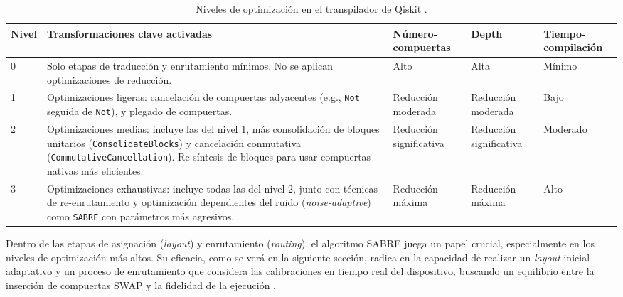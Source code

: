 \documentclass[12pt, spanish]{book}
\begin{document}
\begin{table}[htbp]
    \centering
    \caption{Niveles de optimización en el transpilador de Qiskit \cite{IBM_transpile_2025}.\\}
    \label{tab:opt_levels}
    \begin{tabular}{p{0.7cm} p{6.3cm} p{1.6cm} p{1.6cm} p{1.6cm}}
        \toprule
        \textbf{Nivel} & \textbf{Transformaciones clave activadas}                                                                                                                                                                                                             & \textbf{Número-compuertas} & \textbf{Depth}          & \textbf{Tiempo-compilación} \\
        \midrule
        0              & Solo etapas de traducción y enrutamiento mínimos. No se aplican optimizaciones de reducción.                                                                                                                                                          & Alto                       & Alta                    & Mínimo                      \\
        1              & Optimizaciones ligeras: cancelación de compuertas adyacentes (e.g., \texttt{Not} seguida de \texttt{Not}), y plegado de compuertas.                                                                                                                   & Reducción moderada         & Reducción moderada      & Bajo                        \\
        2              & Optimizaciones medias: incluye las del nivel 1, más consolidación de bloques unitarios (\texttt{ConsolidateBlocks}) y cancelación conmutativa (\texttt{CommutativeCancellation}). Re-síntesis de bloques para usar compuertas nativas más eficientes. & Reducción significativa    & Reducción significativa & Moderado                    \\
        3              & Optimizaciones exhaustivas: incluye todas las del nivel 2, junto con técnicas de re-enrutamiento y optimización dependientes del ruido (\textit{noise-adaptive}) como \texttt{SABRE} con parámetros más agresivos.                                    & Reducción máxima           & Reducción máxima        & Alto                        \\
        \bottomrule
    \end{tabular}
\end{table}

Dentro de las etapas de asignación (\textit{layout}) y enrutamiento (\textit{routing}), el algoritmo SABRE juega un papel crucial, especialmente en los niveles de optimización más altos. Su eficacia, como se verá en la siguiente sección, radica en la capacidad de realizar un \textit{layout} inicial adaptativo y un proceso de enrutamiento que considera las calibraciones en tiempo real del dispositivo, buscando un equilibrio entre la inserción de compuertas SWAP y la fidelidad de la ejecución \cite{IBM_SABRE_2025}.\\
\end{document}
